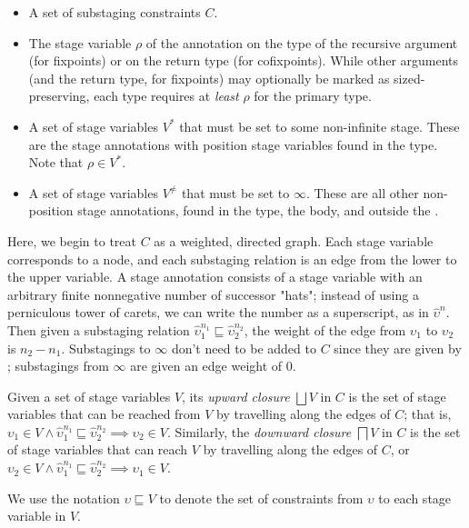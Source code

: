 \documentclass[acmsmall,nonacm,screen,review,anonymous,10pt]{acmart}
\begin{document}
\begin{itemize}
    \item A set of substaging constraints $C$.
    \item The stage variable $\rho$ of the annotation on the type of the recursive argument (for fixpoints) or on the return type (for cofixpoints). While other arguments (and the return type, for fixpoints) may optionally be marked as sized-preserving, each \cofixpoint type requires at \textit{least} $\rho$ for the primary \corecursive type.
    \item A set of stage variables $V^*$ that must be set to some non-infinite stage. These are the stage annotations with position stage variables found in the \cofixpoint type. Note that $\rho \in V^*$.
    \item A set of stage variables $V^\neq$ that must be set to $\infty$. These are all other non-position stage annotations, found in the \cofixpoint type, the \cofixpoint body, and outside the \cofixpoint.
\end{itemize}

Here, we begin to treat $C$ as a weighted, directed graph. Each stage variable corresponds to a node, and each substaging relation is an edge from the lower to the upper variable. A stage annotation consists of a stage variable with an arbitrary finite nonnegative number of successor "hats"; instead of using a perniculous tower of carets, we can write the number as a superscript, as in $\hat{\upsilon}^n$. Then given a substaging relation $\hat{\upsilon}_1^{n_1} \sqsubseteq \hat{\upsilon}_2^{n_2}$, the weight of the edge from $\upsilon_1$ to $\upsilon_2$ is $n_2 - n_1$. Substagings to $\infty$ don't need to be added to $C$ since they are given by ; substagings from $\infty$ are given an edge weight of $0$.

Given a set of stage variables $V$, its \textit{upward closure} $\bigsqcup V$ in $C$ is the set of stage variables that can be reached from $V$ by travelling along the edges of $C$; that is, $\upsilon_1 \in V \wedge \hat{\upsilon}_1^{n_1} \sqsubseteq \hat{\upsilon}_2^{n_2} \implies \upsilon_2 \in V$. Similarly, the \textit{downward closure} $\bigsqcap V$ in $C$ is the set of stage variables that can reach $V$ by travelling along the edges of $C$, or $\upsilon_2 \in V \wedge \hat{\upsilon}_1^{n_1} \sqsubseteq \hat{\upsilon}_2^{n_2} \implies \upsilon_1 \in V$.

We use the notation $\upsilon \sqsubseteq V$ to denote the set of constraints from $\upsilon$ to each stage variable in $V$.
\end{document}
